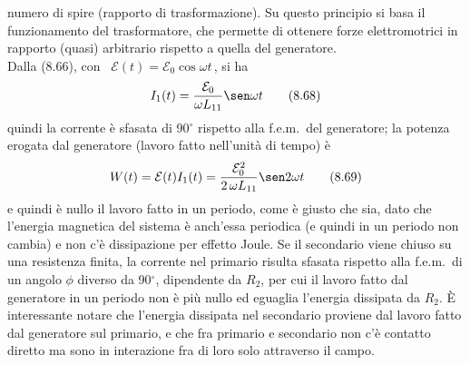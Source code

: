 numero di spire (rapporto di trasformazione). Su questo principio si basa il
funzionamento del trasformatore, che permette di ottenere forze elettromotrici
in rapporto (quasi) arbitrario rispetto a quella del generatore.\\
Dalla (8.66), con \ $\mathcal E(t)=\mathcal E_0\cos\omega t$\,, si ha
\begin{equation}
  I_1(t)=\frac{\mathcal E_0}{\omega L_{11}}\sen\omega t
  \tag{8.68}
\end{equation}
quindi la corrente \`e sfasata di 90$^\circ$ rispetto alla f.e.m.\ del
generatore; la potenza erogata dal generatore (lavoro fatto nell'unit\`a di
tempo) \`e
\begin{equation}
  W(t)=\mathcal E(t)I_1(t)=\frac{\mathcal E_0^2}{2\,\omega L_{11}}\sen2\omega t
  \tag{8.69}
\end{equation}
e quindi \`e nullo il lavoro fatto in un periodo, come \`e giusto che sia, dato
che l'energia magnetica del sistema \`e anch'essa periodica (e quindi in un
periodo non cambia) e non c'\`e dissipazione per effetto Joule. Se il secondario
viene chiuso su una resistenza finita, la corrente nel primario risulta sfasata
rispetto alla f.e.m.\ di un angolo $\phi$ diverso da 90$^\circ$, dipendente da
$R_2$, per cui il lavoro fatto dal generatore in un periodo non \`e pi\`u nullo
ed eguaglia l'energia dissipata da $R_2$. \`E interessante notare che l'energia
dissipata nel secondario proviene dal lavoro fatto dal generatore sul primario,
e che fra primario e secondario non c'\`e contatto diretto ma sono in
interazione fra di loro solo attraverso il campo.
